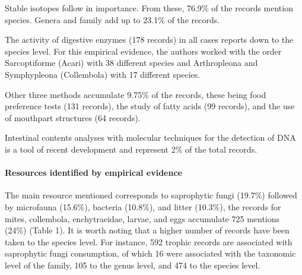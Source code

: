 \documentclass[10pt,oneside]{article}
\begin{document}
Stable isotopes follow in importance. From these, 76.9\% of the records
mention species. Genera and family add up to 23.1\% of the records.

The activity of digestive enzymes (178 records) in all cases reports
down to the species level. For this empirical evidence, the authors
worked with the order Sarcoptiforme (Acari) with 38 different species
and Arthropleona and Symphypleona (Collembola) with 17 different
species.

Other three methods accumulate 9.75\% of the records, these being food
preference tests (131 records), the study of fatty acids (99 records),
and the use of mouthpart structures (64 records).

Intestinal contents analyses with molecular techniques for the detection
of DNA is a tool of recent development and represent 2\% of the total
records.

\hypertarget{resources-identified-by-empirical-evidence}{%
\paragraph{Resources identified by empirical
evidence}\label{resources-identified-by-empirical-evidence}}

The main resource mentioned corresponds to saprophytic fungi (19.7\%)
followed by microfauna (15.6\%), bacteria (10.8\%), and litter (10.3\%),
the records for mites, collembola, enchytraeidae, larvae, and eggs
accumulate 725 mentions (24\%) (Table 1). It is worth noting that a
higher number of records have been taken to the species level. For
instance, 592 trophic records are associated with saprophytic fungi
consumption, of which 16 were associated with the taxonomic level of the
family, 105 to the genus level, and 474 to the species level.
\end{document}
